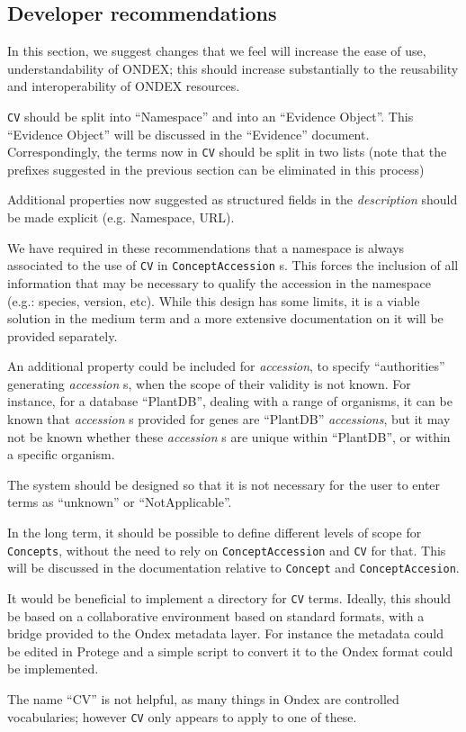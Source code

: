 \documentclass[a4paper,10pt]{article}
\newcommand{\example}[1]{\item\textbf{Example: }#1\xspace}
\newcommand{\field}[1]{\textit{#1}\xspace}
\newcommand{\term}[1]{\texttt{#1}\xspace}
\begin{document}


\subsection{Developer recommendations}

In this section, we suggest changes that we feel will increase the ease of
use, understandability of ONDEX; this should increase substantially to the
reusability and interoperability of ONDEX resources. 


\term{CV} should be split into ``Namespace'' and into an ``Evidence Object''.
This ``Evidence Object'' will be discussed in the ``Evidence'' document.
Correspondingly, the terms now in \term{CV} should be split in two lists (note
that the prefixes suggested in the previous section can be eliminated in this
process)

Additional properties now suggested as structured fields in the
\field{description} should be made explicit (e.g. Namespace, URL).

We have required in these recommendations that a namespace is always
associated to the use of \term{CV} in \term{ConceptAccession}s. This forces
the inclusion of all information that may be necessary to qualify the
accession in the namespace (e.g.: species, version, etc). While this design
has some limits, it is a viable solution in the medium term and a more
extensive documentation on it will be provided separately.

An additional property could be included for \field{accession}, to specify
``authorities'' generating \field{accession}s, when the scope of their
validity is not known. For instance, for a database ``PlantDB'', dealing with
a range of organisms, it can be known that \field{accession}s provided for
genes are ``PlantDB'' \field{accessions}, but it may not be known whether
these \field{accession}s are unique within ``PlantDB'', or within a specific
organism.

The system should be designed so that it is not necessary for the user to
enter terms as ``unknown'' or ``NotApplicable''.

In the long term, it should be possible to define different levels of scope
for \term{Concepts}, without the need to rely on \term{ConceptAccession} and
\term{CV} for that. This will be discussed in the documentation relative to
\term{Concept} and \term{ConceptAccesion}.

It would be beneficial to implement a directory for \term{CV} terms. Ideally,
this should be based on a collaborative environment based on standard formats,
with a bridge provided to the Ondex metadata layer. For instance the metadata
could be edited in Protege and a simple script to convert it to the Ondex
format could be implemented.

The name ``CV'' is not helpful, as many things in Ondex are controlled
vocabularies; however \term{CV} only appears to apply to one of these.
\end{document}
